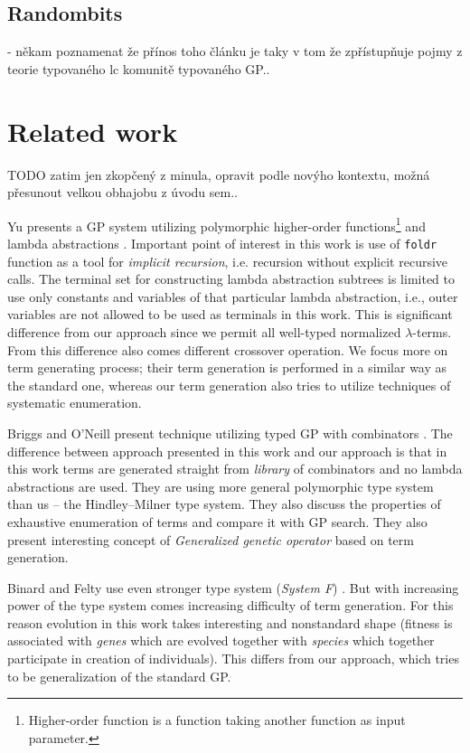 \documentclass{sig-alternate}
\newcommand{\lterms}{$\lambda$-terms\xspace}
\newcommand{\red}[1]{{\color{red} #1}}
\begin{document}
\subsection{\red{Randombits}}
\red{

- někam poznamenat že přínos toho článku je taky v tom že zpřístupňuje pojmy z teorie typovaného lc komunitě typovaného GP.. 


}



\section{Related work}
\label{related}

\red{TODO zatim jen zkopčený z minula, opravit podle novýho kontextu,
možná přesunout velkou obhajobu z úvodu sem..}

Yu presents a GP system utilizing
polymorphic higher-order functions\footnote{Higher-order 
function is a function taking another function as 
input parameter.} and lambda abstractions  \cite{yu01}.
Important point of interest in this work is use of
\texttt{foldr} function as a tool for \textit{implicit recursion},
i.e. recursion without explicit recursive calls. 
The terminal set for constructing lambda abstraction subtrees 
is limited to use only constants and variables of that particular
lambda abstraction, i.e., outer variables are not allowed to be used
as terminals in this work. This is significant difference from our approach 
since we permit all well-typed normalized \lterms. From this difference also
comes different crossover operation. We focus more on term generating process; 
their term generation is performed in a similar way as the standard one, 
whereas our term generation also tries to utilize techniques of systematic enumeration. 

Briggs and O’Neill present technique 
utilizing typed GP with combinators \cite{kes}.
The difference between approach presented in this work
and our approach is that in this work terms are generated
straight from \textit{library} of combinators and no lambda abstractions
are used. They are using more general polymorphic type system than us
-- the Hindley–Milner type system. They also discuss the 
properties of exhaustive enumeration of terms and compare it with GP search.  
They also present interesting concept of \textit{Generalized
genetic operator} based on term generation. 

Binard and Felty use even 
stronger type system (\textit{System F}) \cite{binard2008genetic}.  
But with increasing power of the type system comes increasing difficulty of term generation.
For this reason evolution in this work takes interesting and nonstandard shape 
(fitness is associated with \textit{genes} which are evolved together with \textit{species}
which together participate in creation of individuals).
This differs from our approach, which tries to be generalization of
the standard GP\cite{koza92}.
\end{document}
